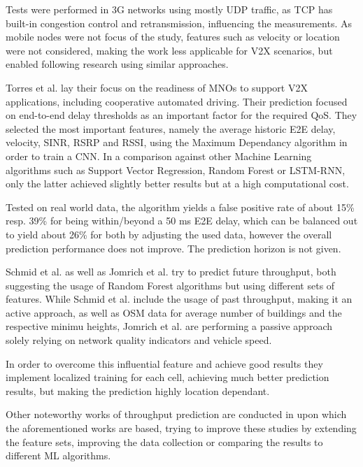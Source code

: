 \documentclass[conference]{IEEEtran}
\begin{document}
Tests were performed in 3G networks using mostly UDP traffic, as TCP has built-in congestion control and retransmission, influencing the measurements. As mobile nodes were not focus of the study, features such as velocity or location were not considered, making the work less applicable for V2X scenarios, but enabled following research using similar approaches.

Torres et al. \cite{torres-figueroaQoSEvaluationPrediction2020} lay their focus on the readiness of MNOs to support V2X applications, including cooperative automated driving. Their prediction focused on end-to-end delay thresholds as an important factor for the required QoS. They selected the most important features, namely the average historic E2E delay, velocity, SINR, RSRP and RSSI, using the Maximum Dependancy algorithm in order to train a CNN. In a comparison against other Machine Learning algorithms such as Support Vector Regression, Random Forest or LSTM-RNN, only the latter achieved slightly better results but at a high computational cost.

Tested on real world data, the algorithm yields a false positive rate of about 15\% resp. 39\% for being within/beyond a 50 ms E2E delay, which can be balanced out to yield about 26\% for both by adjusting the used data, however the overall prediction performance does not improve. The prediction horizon is not given.

Schmid et al. \cite{schmidDeepLearningApproach2019, schmidComparisonAIBasedThroughput2019} as well as Jomrich et al. \cite{jomrichEnhancedCellularBandwidth2019} try to predict future throughput, both suggesting the usage of Random Forest algorithms but using different sets of features.
While Schmid et al. include the usage of past throughput, making it an active approach, as well as OSM data for average number of buildings and the respective minimu heights, Jomrich et al. are performing a passive approach solely relying on network quality indicators and vehicle speed.

In order to overcome this influential feature and achieve good results they implement localized training for each cell, achieving much better prediction results, but making the prediction highly location dependant.

Other noteworthy works of throughput prediction are conducted in \cite{falkenbergDiscoverYourCompetition2017,yueLinkForecastCellularLink2018,sambaInstantaneousThroughputPrediction2017,sambaThroughputPredictionCellular} upon which the aforementioned works are based, trying to improve these studies by extending the feature sets, improving the data collection or comparing the results to different ML algorithms.
\end{document}
